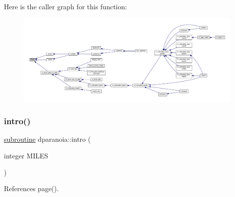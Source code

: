 Here is the caller graph for this function\+:
\nopagebreak
\begin{figure}[H]
\begin{center}
\leavevmode
\includegraphics[width=350pt]{dparanoia_8f90_a86b4fbb4f2e0083655b4f87fea7c9774_icgraph}
\end{center}
\end{figure}
\mbox{\label{dparanoia_8f90_a9116036ac9f8a3d17b60a83da0f1657e}} 
\subsubsection{\texorpdfstring{intro()}{intro()}}
{\footnotesize\ttfamily \hyperlink{M__stopwatch_83_8txt_acfbcff50169d691ff02d4a123ed70482}{subroutine} dparanoia\+::intro (\begin{DoxyParamCaption}\item[{integer}]{M\+I\+L\+ES }\end{DoxyParamCaption})}



References page().

